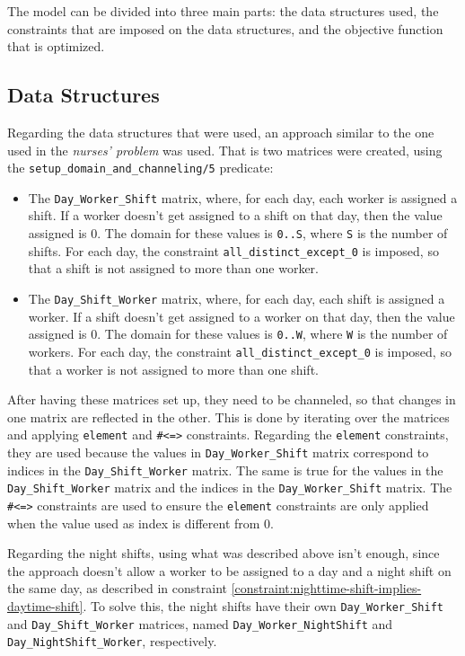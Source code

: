 \documentclass[conference]{IEEEtran}
\begin{document}
The model can be divided into three main parts: the data structures used, the constraints that are imposed on the data structures, and the objective function that is optimized.

\subsection{Data Structures}
\label{section:data-structures}

Regarding the data structures that were used, an approach similar to the one used in the \textit{nurses' problem} was used. That is two matrices were created, using the \texttt{setup\_domain\_and\_channeling/5} predicate:

\begin{itemize}
    \item {
        The \texttt{Day\_Worker\_Shift} matrix, where, for each day, each worker is assigned a shift. If a worker doesn't get assigned to a shift on that day, then the value assigned is 0.
        The domain for these values is \texttt{0..S}, where \texttt{S} is the number of shifts. For each day, the constraint \texttt{all\_distinct\_except\_0} is imposed, so that a shift is not assigned to more than one worker.
    }
    \item {
        The \texttt{Day\_Shift\_Worker} matrix, where, for each day, each shift is assigned a worker. If a shift doesn't get assigned to a worker on that day, then the value assigned is 0.
        The domain for these values is \texttt{0..W}, where \texttt{W} is the number of workers. For each day, the constraint \texttt{all\_distinct\_except\_0} is imposed, so that a worker is not assigned to more than one shift.
    }
\end{itemize}

After having these matrices set up, they need to be channeled, so that changes in one matrix are reflected in the other.
This is done by iterating over the matrices and applying \texttt{element} and \texttt{\#<=>} constraints. Regarding the \texttt{element} constraints, they are used because the values in \texttt{Day\_Worker\_Shift} matrix correspond to indices in the \texttt{Day\_Shift\_Worker} matrix. The same is true for the values in the \texttt{Day\_Shift\_Worker} matrix and the indices in the \texttt{Day\_Worker\_Shift} matrix. The \texttt{\#<=>} constraints are used to ensure the \texttt{element} constraints are only applied when the value used as index is different from 0.

Regarding the night shifts, using what was described above isn't enough, since the approach doesn't allow a worker to be assigned to a day and a night shift on the same day, as described in constraint \ref{constraint:nighttime-shift-implies-daytime-shift}.
To solve this, the night shifts have their own \texttt{Day\_Worker\_Shift} and \texttt{Day\_Shift\_Worker} matrices, named \texttt{Day\_Worker\_NightShift} and \texttt{Day\_NightShift\_Worker}, respectively.
\end{document}
